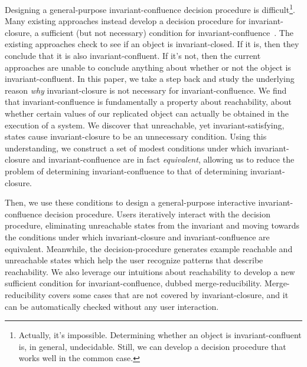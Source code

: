 Designing a general-purpose invariant-confluence decision procedure is
difficult\footnote{Actually, it's impossible. Determining whether an object is
invariant-confluent is, in general, undecidable. Still, we can develop a
decision procedure that works well in the common case.}. Many existing
approaches instead develop a decision procedure for invariant-closure, a
sufficient (but not necessary) condition for
invariant-confluence~\cite{li2012making, li2014automating}. The existing
approaches check to see if an object is invariant-closed. If it is, then they
conclude that it is also invariant-confluent. If it's not, then the current
approaches are unable to conclude anything about whether or not the object is
invariant-confluent. In this paper, we take a step back and study the
underlying reason \emph{why} invariant-closure is not necessary for
invariant-confluence. We find that invariant-confluence is fundamentally a
property about reachability, about whether certain values of our replicated
object can actually be obtained in the execution of a system. We discover that
unreachable, yet invariant-satisfying, states cause invariant-closure to be an
unnecessary condition. Using this understanding, we construct a set of modest
conditions under which invariant-closure and invariant-confluence are in fact
\emph{equivalent}, allowing us to reduce the problem of determining
invariant-confluence to that of determining invariant-closure.


Then, we use these conditions to design a general-purpose interactive
invariant-confluence decision procedure. Users iteratively interact with the
decision procedure, eliminating unreachable states from the invariant and
moving towards the conditions under which invariant-closure and
invariant-confluence are equivalent. Meanwhile, the decision-procedure
generates example reachable and unreachable states which help the user
recognize patterns that describe reachability. We also leverage our intuitions
about reachability to develop a new sufficient condition for
invariant-confluence, dubbed merge-reducibility. Merge-reducibility covers some
cases that are not covered by invariant-closure, and it can be automatically
checked without any user interaction.

